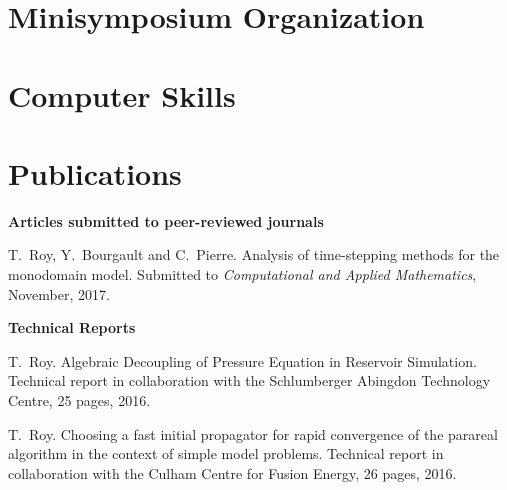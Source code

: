\documentclass[11pt,a4paper,roman]{moderncv} %
\begin{document}
\section{Minisymposium Organization}


\section{Computer Skills}



\newpage
\section{Publications}

\textbf{Articles submitted to peer-reviewed journals}

T.~Roy, Y.~Bourgault and C.~Pierre.
\newblock Analysis of time-stepping methods for the monodomain model.
\newblock Submitted to {\em Computational and Applied Mathematics}, November, 2017.
\vspace{0.5em}

\textbf{Technical Reports}

T.~Roy.
\newblock Algebraic Decoupling of Pressure Equation in Reservoir Simulation.
\newblock Technical report in collaboration with the Schlumberger Abingdon Technology Centre, 25 pages, 2016.

\vspace{0.5em}

T.~Roy.
\newblock Choosing a fast initial propagator for rapid convergence of the parareal algorithm in the context of simple model problems.
\newblock Technical report in collaboration with the Culham Centre for Fusion Energy, 26 pages, 2016.
\end{document}
